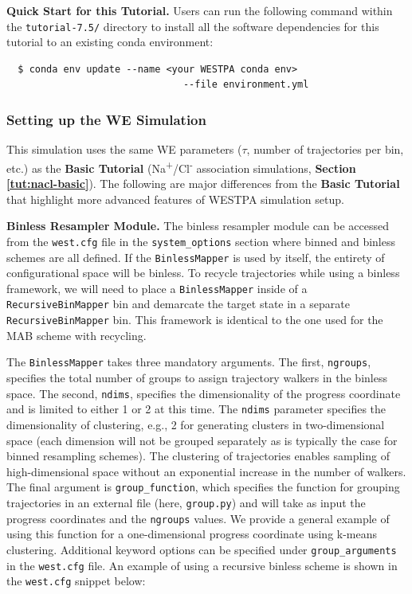 \textbf{Quick Start for this Tutorial.} Users can run the following command within the \verb|tutorial-7.5/| directory to install all the software dependencies for this tutorial to an existing conda environment:

\begin{verbatim}
  $ conda env update --name <your WESTPA conda env> 
                               --file environment.yml
\end{verbatim}


\subsubsection{Setting up the WE Simulation}
This simulation uses the same WE parameters ($\tau$, number of trajectories per bin, etc.) as the \textbf{Basic Tutorial} (Na\textsuperscript{+}/Cl\textsuperscript{-} association simulations, \textbf{Section \ref{tut:nacl-basic}}). 
The following are major differences from the \textbf{Basic Tutorial} that highlight more advanced features of WESTPA simulation setup.

\textbf{Binless Resampler Module.} The binless resampler module can be accessed from the \verb|west.cfg| file in the \verb|system_options| section where binned and binless schemes are all defined. 
If the \verb|BinlessMapper| is used by itself, the entirety of configurational space will be binless. 
To recycle trajectories while using a binless framework, we will need to place a \verb|BinlessMapper| inside of a \verb|RecursiveBinMapper| bin and demarcate the target state in a separate \verb|RecursiveBinMapper| bin. 
This framework is identical to the one used for the MAB scheme with recycling.

The \verb|BinlessMapper| takes three mandatory arguments. 
The first, \verb|ngroups|, specifies the total number of groups to assign trajectory walkers in the binless space. 
The second, \verb|ndims|, specifies the dimensionality of the progress coordinate and is limited to either 1 or 2 at this time. 
The \verb|ndims| parameter specifies the dimensionality of clustering, e.g., 2 for generating clusters in two-dimensional space (each dimension will not be grouped separately as is typically the case for binned resampling schemes). 
The clustering of trajectories enables sampling of high-dimensional space without an exponential increase in the number of walkers. 
The final argument is \verb|group_function|, which specifies the function for grouping trajectories in an external file (here, \verb|group.py|) and will take as input the progress coordinates and the \verb|ngroups| values. 
We provide a general example of using this function for a one-dimensional progress coordinate using k-means clustering. 
Additional keyword options can be specified under \verb|group_arguments| in the \verb|west.cfg| file. 
An example of using a recursive binless scheme is shown in the \verb|west.cfg| snippet below:

